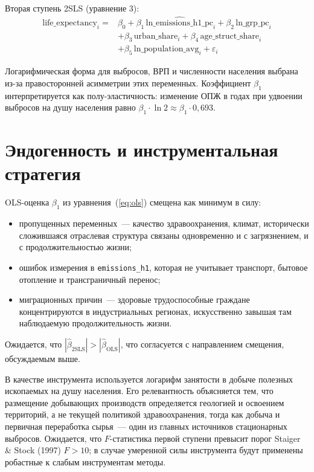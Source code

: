 \documentclass[11pt,a4paper]{article}
\begin{document}
Вторая ступень 2SLS (уравнение 3):
\begin{equation}
\label{eq:ss}
\begin{aligned}
\text{life\_expectancy}_i = {} & \beta_0 + \beta_1\,\widehat{\text{ln\_emissions\_h1\_pc}}_i + \beta_2\,\text{ln\_grp\_pc}_i \\
& + \beta_3\,\text{urban\_share}_i + \beta_4\,\text{age\_struct\_share}_i \\
& + \beta_5\,\text{ln\_population\_avg}_i + \varepsilon_i
\end{aligned}
\end{equation}

Логарифмическая форма для выбросов, ВРП и численности населения выбрана из-за правосторонней асимметрии этих переменных. Коэффициент $\beta_1$ интерпретируется как полу-эластичность: изменение ОПЖ в годах при удвоении выбросов на душу населения равно $\beta_1\cdot\ln 2 \approx \beta_1\cdot 0{,}693$.

\section*{Эндогенность и инструментальная стратегия}

OLS-оценка $\beta_1$ из уравнения~(\ref{eq:ols}) смещена как минимум в силу:
\begin{itemize}
  \item пропущенных переменных~--- качество здравоохранения, климат, исторически сложившаяся отраслевая структура связаны одновременно и с загрязнением, и с продолжительностью жизни;
  \item ошибок измерения в \texttt{emissions\_h1}, которая не учитывает транспорт, бытовое отопление и трансграничный перенос;
  \item миграционных причин~--- здоровые трудоспособные граждане концентрируются в индустриальных регионах, искусственно завышая там наблюдаемую продолжительность жизни.
\end{itemize}

Ожидается, что $|\hat\beta_{\text{2SLS}}| > |\hat\beta_{\text{OLS}}|$, что согласуется с направлением смещения, обсуждаемым выше.

В качестве инструмента используется логарифм занятости в добыче полезных ископаемых на душу населения. Его релевантность объясняется тем, что размещение добывающих производств определяется геологией и освоением территорий, а не текущей политикой здравоохранения, тогда как добыча и первичная переработка сырья~--- один из главных источников стационарных выбросов. Ожидается, что $F$-статистика первой ступени превысит порог Staiger \& Stock (1997) $F > 10$; в случае умеренной силы инструмента будут применены робастные к слабым инструментам методы.
\end{document}
